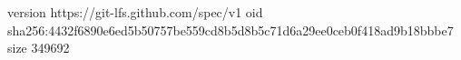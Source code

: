version https://git-lfs.github.com/spec/v1
oid sha256:4432f6890e6ed5b50757be559cd8b5d8b5c71d6a29ee0ceb0f418ad9b18bbbe7
size 349692
